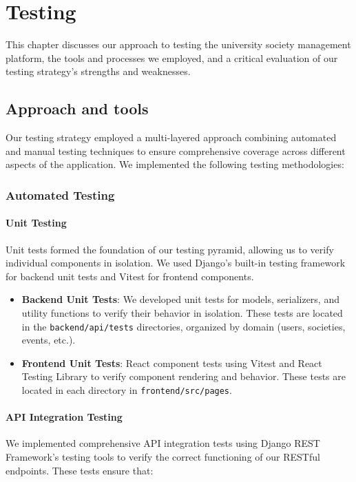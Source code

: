 \chapter{Testing}
\label{chap:testing}

This chapter discusses our approach to testing the university society management platform, the tools and processes we employed, and a critical evaluation of our testing strategy's strengths and weaknesses.

\section{Approach and tools}
\label{sect:testing:approach}

Our testing strategy employed a multi-layered approach combining automated and manual testing techniques to ensure comprehensive coverage across different aspects of the application. We implemented the following testing methodologies:

\subsection{Automated Testing}

\subsubsection{Unit Testing}
Unit tests formed the foundation of our testing pyramid, allowing us to verify individual components in isolation. We used Django's built-in testing framework for backend unit tests and Vitest for frontend components.

\begin{itemize}
    \item \textbf{Backend Unit Tests}: We developed unit tests for models, serializers, and utility functions to verify their behavior in isolation. These tests are located in the \texttt{backend/api/tests}  directories, organized by domain (users, societies, events, etc.).
    
    \item \textbf{Frontend Unit Tests}: React component tests using Vitest and React Testing Library to verify component rendering and behavior. These tests are located in each directory in \texttt{frontend/src/pages}.
\end{itemize}

\subsubsection{API Integration Testing}
We implemented comprehensive API integration tests using Django REST Framework's testing tools to verify the correct functioning of our RESTful endpoints. These tests ensure that:

